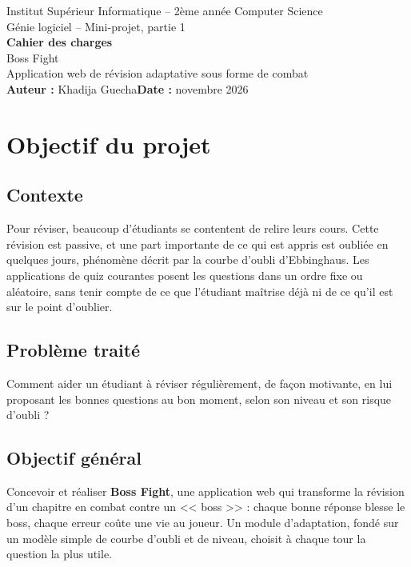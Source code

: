 \documentclass[11pt,a4paper]{article}
\begin{document}
\begin{center}
  {\large Institut Sup\'erieur Informatique -- 2\`eme ann\'ee Computer Science}\\[0.4cm]
  {\large G\'enie logiciel -- Mini-projet, partie 1}\\[0.8cm]
  {\Huge\bfseries\color{accent} Cahier des charges}\\[0.3cm]
  {\LARGE Boss Fight}\\[0.2cm]
  {\large Application web de r\'evision adaptative sous forme de combat}\\[0.8cm]
  {\large \textbf{Auteur :} Khadija Guecha\qquad \textbf{Date :} novembre 2026}
\end{center}

\vspace{0.4cm}
\tableofcontents
\newpage

\section{Objectif du projet}

\subsection{Contexte}
Pour r\'eviser, beaucoup d'\'etudiants se contentent de relire leurs cours. Cette r\'evision est passive, et une part importante de ce qui est appris est oubli\'ee en quelques jours, ph\'enom\`ene d\'ecrit par la courbe d'oubli d'Ebbinghaus. Les applications de quiz courantes posent les questions dans un ordre fixe ou al\'eatoire, sans tenir compte de ce que l'\'etudiant ma\^itrise d\'ej\`a ni de ce qu'il est sur le point d'oublier.

\subsection{Probl\`eme trait\'e}
Comment aider un \'etudiant \`a r\'eviser r\'eguli\`erement, de fa\c{c}on motivante, en lui proposant les bonnes questions au bon moment, selon son niveau et son risque d'oubli ?

\subsection{Objectif g\'en\'eral}
Concevoir et r\'ealiser \textbf{Boss Fight}, une application web qui transforme la r\'evision d'un chapitre en combat contre un << boss >> : chaque bonne r\'eponse blesse le boss, chaque erreur co\^ute une vie au joueur. Un module d'adaptation, fond\'e sur un mod\`ele simple de courbe d'oubli et de niveau, choisit \`a chaque tour la question la plus utile.
\end{document}

